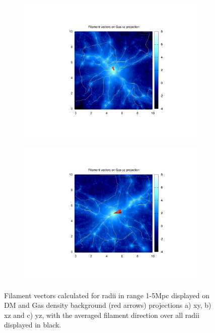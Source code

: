 \documentclass[journal]{IEEEtran}
\begin{document}
\begin{figure}[!t]
\begin{subfigure}[t]{0.3\textwidth}
		\includegraphics[width=\linewidth]{FilxzGas}
	\end{subfigure}
	\quad
	\begin{subfigure}[t]{0.3\textwidth}
		\centering
		\includegraphics[width=\linewidth]{FilyzGas}
	\end{subfigure}
\label{fig:fil_calc}
	\caption{Filament vectors calculated for radii in range 1-5Mpc displayed on DM and Gas density background (red arrows) projections a) xy, b) xz and c) yz, with the averaged filament direction over all radii displayed in black.}
\end{figure}
\end{document}

